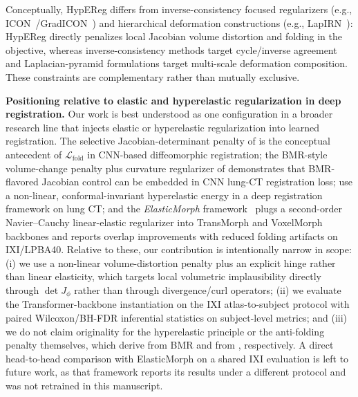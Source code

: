 \documentclass[jimaging,article,submit,pdftex,moreauthors]{Definitions/mdpi}
\begin{document}
Conceptually, HypEReg differs from inverse-consistency focused regularizers (e.g., ICON~\cite{greer2021icon}/GradICON~\cite{tian2023gradicon}) and hierarchical deformation constructions (e.g., LapIRN~\cite{mok2020lapirn}): HypEReg directly penalizes local Jacobian volume distortion and folding in the objective, whereas inverse-consistency methods target cycle/inverse agreement and Laplacian-pyramid formulations target multi-scale deformation composition. These constraints are complementary rather than mutually exclusive.

\noindent\textbf{Positioning relative to elastic and hyperelastic regularization in deep registration.}
Our work is best understood as one configuration in a broader research line that injects elastic or hyperelastic regularization into learned registration. The selective Jacobian-determinant penalty of \citet{mok2020fast} is the conceptual antecedent of $\mathcal{L}_{\mathrm{fold}}$ in CNN-based diffeomorphic registration; the BMR-style volume-change penalty plus curvature regularizer of \citet{hering2021lung} demonstrates that BMR-flavored Jacobian control can be embedded in CNN lung-CT registration loss; \citet{zou2023conformal} use a non-linear, conformal-invariant hyperelastic energy in a deep registration framework on lung CT; and the \emph{ElasticMorph} framework~\cite{elasticmorph2025} plugs a second-order Navier--Cauchy linear-elastic regularizer into TransMorph and VoxelMorph backbones and reports overlap improvements with reduced folding artifacts on IXI/LPBA40. Relative to these, our contribution is intentionally narrow in scope: (i) we use a non-linear volume-distortion penalty plus an explicit hinge rather than linear elasticity, which targets local volumetric implausibility directly through $\det J_\phi$ rather than through divergence/curl operators; (ii) we evaluate the Transformer-backbone instantiation on the IXI atlas-to-subject protocol with paired Wilcoxon/BH-FDR inferential statistics on subject-level metrics; and (iii) we do not claim originality for the hyperelastic principle or the anti-folding penalty themselves, which derive from BMR \cite{burger2013hyperelastic} and from \citet{mok2020fast}, respectively. A direct head-to-head comparison with ElasticMorph on a shared IXI evaluation is left to future work, as that framework reports its results under a different protocol and was not retrained in this manuscript.
\end{document}
